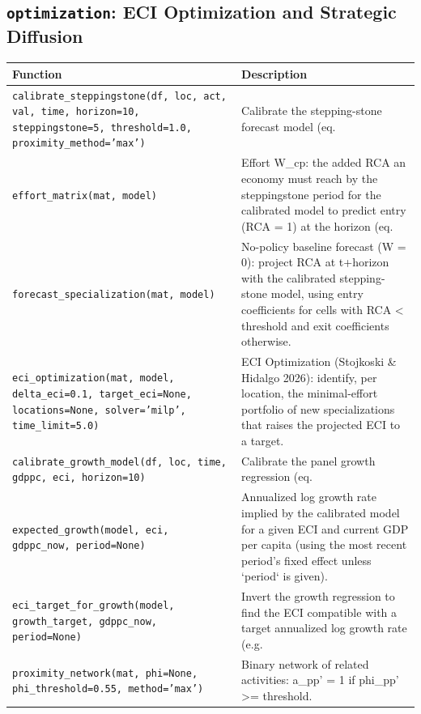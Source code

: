 \subsection{\texttt{optimization}: ECI Optimization and Strategic Diffusion}
\begin{longtable}{>{\raggedright\arraybackslash}p{9.2cm} >{\raggedright\arraybackslash}p{7.0cm}}
\toprule
\textbf{Function} & \textbf{Description} \\
\midrule\endhead
\texttt{\footnotesize calibrate\_steppingstone(df, loc, act, val, time, horizon=10, steppingstone=5, threshold=1.0, proximity\_method='max')} & {\small Calibrate the stepping-stone forecast model (eq.} \\[2pt]
\texttt{\footnotesize effort\_matrix(mat, model)} & {\small Effort W\_cp: the added RCA an economy must reach by the steppingstone period for the calibrated model to predict entry (RCA = 1) at the horizon (eq.} \\[2pt]
\texttt{\footnotesize forecast\_specialization(mat, model)} & {\small No-policy baseline forecast (W = 0): project RCA at t+horizon with the calibrated stepping-stone model, using entry coefficients for cells with RCA < threshold and exit coefficients otherwise.} \\[2pt]
\texttt{\footnotesize eci\_optimization(mat, model, delta\_eci=0.1, target\_eci=None, locations=None, solver='milp', time\_limit=5.0)} & {\small ECI Optimization (Stojkoski \& Hidalgo 2026): identify, per location, the minimal-effort portfolio of new specializations that raises the projected ECI to a target.} \\[2pt]
\texttt{\footnotesize calibrate\_growth\_model(df, loc, time, gdppc, eci, horizon=10)} & {\small Calibrate the panel growth regression (eq.} \\[2pt]
\texttt{\footnotesize expected\_growth(model, eci, gdppc\_now, period=None)} & {\small Annualized log growth rate implied by the calibrated model for a given ECI and current GDP per capita (using the most recent period's fixed effect unless `period` is given).} \\[2pt]
\texttt{\footnotesize eci\_target\_for\_growth(model, growth\_target, gdppc\_now, period=None)} & {\small Invert the growth regression to find the ECI compatible with a target annualized log growth rate (e.g.} \\[2pt]
\texttt{\footnotesize proximity\_network(mat, phi=None, phi\_threshold=0.55, method='max')} & {\small Binary network of related activities: a\_pp' = 1 if phi\_pp' >= threshold.} \\[2pt]

\end{longtable}
